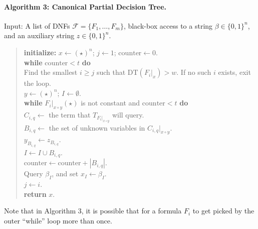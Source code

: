 \paragraph{Algorithm 3: Canonical Partial Decision Tree.} Input: A list of DNFs $\mathcal F=\{F_1,\ldots,F_m\}$, black-box access to a string $\beta\in\{0,1\}^n$, and an auxiliary string $z\in\{0,1\}^n$.
\begin{quote}\textbf{initialize:} $x\leftarrow(\star)^n$; $j\leftarrow1$; $\mathrm{counter}\leftarrow0$.\\
\textbf{while} $\mathrm{counter}<t$ \textbf{do}\\
\hspace*{1em}Find the smallest $i\ge j$ such that $\mathrm{DT}(F_i|_x)>w$. If no such $i$ exists, exit the loop.\\
\hspace*{1em}$y\leftarrow(\star)^n$; $I\leftarrow\emptyset$.\\
\hspace*{1em}\textbf{while} $F_i|_{x\circ y}(\star)$ is not constant and $\mathrm{counter}<t$ \textbf{do}\\
\hspace*{2em}$C_{i,q}\leftarrow$ the term that $T_{F_i|_{x\circ y}}$ will query.\\
\hspace*{2em}$B_{i,q}\leftarrow$ the set of unknown variables in $C_{i,q}|_{x\circ y}$.\\
\hspace*{2em}$y_{B_{i,q}}\leftarrow z_{B_{i,q}}$.\\
\hspace*{2em}$I\leftarrow I\cup B_{i,q}$.\\
\hspace*{2em}$\mathrm{counter}\leftarrow\mathrm{counter}+|B_{i,q}|$.\\
\hspace*{1em}Query $\beta_I$, and set $x_I\leftarrow\beta_I$.\\
\hspace*{1em}$j\leftarrow i$.\\
\textbf{return} $x$.\end{quote}
Note that in Algorithm 3, it is possible that for a formula $F_i$ to get picked by the outer ``while'' loop more than once.
